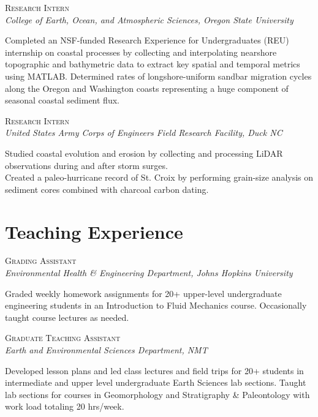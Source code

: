 \documentclass[11pt, letterpaper]{article}
\newcommand{\years}[1]{\marginnote{\scriptsize #1}}
\begin{document}
\years{2013}\textsc{Research Intern}\\
\textit{College of Earth, Ocean, and Atmospheric Sciences, Oregon State University}
\begin{adjustwidth}{5pt}{0pt}
	Completed an NSF-funded Research Experience for Undergraduates (REU)
	internship on coastal processes by collecting and interpolating nearshore
	topographic and bathymetric data to extract key spatial and temporal
	metrics using MATLAB. Determined rates of longshore-uniform sandbar
	migration cycles along the Oregon and Washington coasts representing a huge
	component of seasonal coastal sediment flux.
\end{adjustwidth}

\years{2013}\textsc{Research Intern}\\
\textit{United States Army Corps of Engineers Field Research Facility, Duck NC}
\begin{adjustwidth}{5pt}{0pt}
	Studied coastal evolution and erosion by collecting and processing LiDAR
	observations during and after storm surges.\\
	Created a paleo-hurricane record of St. Croix by performing grain-size
	analysis on sediment cores combined with charcoal carbon dating.
\end{adjustwidth}

\section*{Teaching Experience}
\noindent
\years{2019}\textsc{Grading Assistant}\\
\textit{Environmental Health \& Engineering Department, Johns Hopkins University}
\begin{adjustwidth}{5pt}{0pt}
	Graded weekly homework assignments for 20+ upper-level undergraduate
	engineering students in an Introduction to Fluid Mechanics course.
	Occasionally taught course lectures as needed.
\end{adjustwidth}
\years{2015 - 2016}\textsc{Graduate Teaching Assistant}\\
\textit{Earth and Environmental Sciences Department, NMT}
\begin{adjustwidth}{5pt}{0pt}
	Developed lesson plans and led class lectures and field trips for 20+ students in intermediate and upper level undergraduate Earth Sciences lab sections. Taught lab sections for courses in Geomorphology and Stratigraphy \& Paleontology with work load totaling 20 hrs/week.  
\end{adjustwidth}
\end{document}
